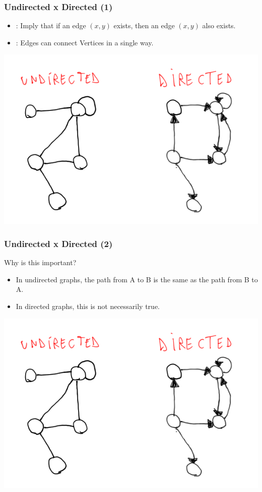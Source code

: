 \documentclass{beamer}
\begin{document}
\begin{frame}
  \frametitle{Undirected x Directed (1)}
  \begin{itemize}
    \item {}: Imply that if an edge $(x,y)$
      exists, then an edge $(x,y)$ also exists.
    \item {}: Edges can connect Vertices in a
      single way.
  \end{itemize}
  \begin{center}
    \includegraphics[height=0.6\textheight]{img/directed}
  \end{center}
\end{frame}

\begin{frame}
  \frametitle{Undirected x Directed (2)}
  \begin{block}{Why is this important?}
    \begin{itemize}
    \item In undirected graphs, the path from A to B is the same as
      the path from B to A.
    \item In directed graphs, this is not necessarily true.
    \end{itemize}
  \end{block}
  \begin{center}
    \includegraphics[height=0.6\textheight]{img/directed}
  \end{center}
\end{frame}
\end{document}

